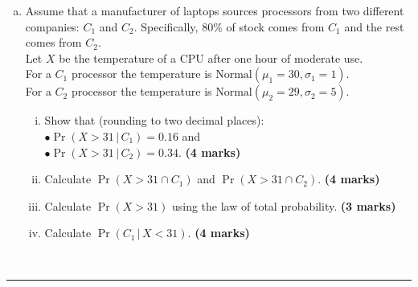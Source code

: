 \documentclass[12pt]{article}
\begin{document}
\begin{enumerate}[a)]
\begin{enumerate}[i)]
    \end{enumerate}
    \begin{center}\noindent\rule{0.4\linewidth}{0.5pt}\end{center}
\item Assume that a manufacturer of laptops sources processors from two different companies: $C_1$ and $C_2$. Specifically, 80\% of stock comes from $C_1$ and the rest comes from $C_2$.\\[0.2cm]
    Let $X$ be the temperature of a CPU after one hour of moderate use.\\[0.3cm]
     For a $C_1$ processor the temperature is $\text{Normal}(\mu_1=30,\sigma_1 = 1)$.\\[0.3cm]
    For a $C_2$ processor the temperature is $\text{Normal}(\mu_2=29,\sigma_2 = 5)$.\\[-0.2cm]
    \begin{enumerate}[i)]\itemsep0.4cm
    \item Show that (rounding to two decimal places): \\[0.2cm]
        $\bullet$\quad$\Pr(X>31\,|\,C_1) = 0.16$ and \\[0.2cm]
        $\bullet$\quad$\Pr(X>31\,|\,C_2) = 0.34$. \hfill{\scriptsize \bf (4 marks)}
    \item Calculate $\Pr(X>31\cap C_1)$ and $\Pr(X>31\cap C_2)$. \hfill{\scriptsize \bf (4 marks)}
    \item Calculate $\Pr(X>31)$ using the law of total probability. \hfill{\scriptsize \bf (3 marks)}
    \item Calculate $\Pr(C_1\,|\,X<31)$. \hfill{\scriptsize \bf (4 marks)}
    \end{enumerate}
\end{enumerate}
\quad\\[-0.3cm]
\noindent\rule{\linewidth}{1pt}

\newpage
\end{document}
